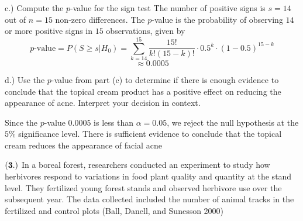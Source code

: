 \documentclass[
]{article}
\begin{document}
c.) Compute the \(p\)-value for the sign test {The number of positive
signs is \(s = 14\) out of \(n = 15\) non-zero differences. The
\(p\)-value is the probability of observing \(14\) or more positive
signs in \(15\) observations, given by
\[p\text{-value} = P(S\geq s | H_0) = \sum_{k = 14}^{15}\frac{15!}{k!(15 - k)!} \cdot 0.5^k \cdot (1-0.5)^{15-k} \]
\[ \approx 0.0005  \] }

d.) Use the \(p\)-value from part (c) to determine if there is enough
evidence to conclude that the topical cream product has a positive
effect on reducing the appearance of acne. Interpret your decision in
context.

{Since the \(p\)-value \(0.0005\) is less than \(\alpha = 0.05\), we
reject the null hypothesis at the \(5\%\) significance level. There is
sufficient evidence to conclude that the topical cream reduces the
appearance of facial acne}

\(\bf (3.)\) In a boreal forest, researchers conducted an experiment to
study how herbivores respond to variations in food plant quality and
quantity at the stand level. They fertilized young forest stands and
observed herbivore use over the subsequent year. The data collected
included the number of animal tracks in the fertilized and control plots
(Ball, Danell, and Sunesson 2000)
\end{document}
